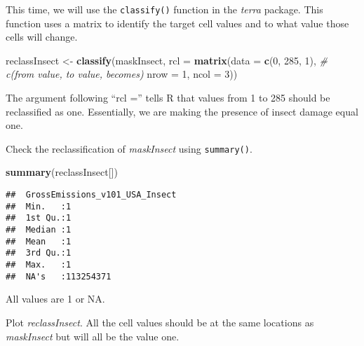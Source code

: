 \documentclass[
]{article}
\newenvironment{Shaded}{\begin{snugshade}}{\end{snugshade}}
\newcommand{\AttributeTok}[1]{\textcolor[rgb]{0.13,0.29,0.53}{#1}}
\newcommand{\CommentTok}[1]{\textcolor[rgb]{0.56,0.35,0.01}{\textit{#1}}}
\newcommand{\DecValTok}[1]{\textcolor[rgb]{0.00,0.00,0.81}{#1}}
\newcommand{\FunctionTok}[1]{\textcolor[rgb]{0.13,0.29,0.53}{\textbf{#1}}}
\newcommand{\NormalTok}[1]{#1}
\newcommand{\OtherTok}[1]{\textcolor[rgb]{0.56,0.35,0.01}{#1}}
\begin{document}
This time, we will use the \texttt{classify()} function in the
\emph{terra} package. This function uses a matrix to identify the target
cell values and to what value those cells will change.

\begin{Shaded}
\begin{Highlighting}[]
\NormalTok{reclassInsect }\OtherTok{\textless{}{-}} \FunctionTok{classify}\NormalTok{(maskInsect, }
                            \AttributeTok{rcl =} \FunctionTok{matrix}\NormalTok{(}\AttributeTok{data =} \FunctionTok{c}\NormalTok{(}\DecValTok{0}\NormalTok{, }\DecValTok{285}\NormalTok{, }\DecValTok{1}\NormalTok{),  }\CommentTok{\# c(from value, to value, becomes)}
                                         \AttributeTok{nrow =} \DecValTok{1}\NormalTok{, }\AttributeTok{ncol =} \DecValTok{3}\NormalTok{))}
\end{Highlighting}
\end{Shaded}

The argument following ``rcl ='' tells R that values from 1 to 285
should be reclassified as one. Essentially, we are making the presence
of insect damage equal one.

Check the reclassification of \emph{maskInsect} using
\texttt{summary()}.

\begin{Shaded}
\begin{Highlighting}[]
\FunctionTok{summary}\NormalTok{(reclassInsect[]) }
\end{Highlighting}
\end{Shaded}

\begin{verbatim}
##  GrossEmissions_v101_USA_Insect
##  Min.   :1                     
##  1st Qu.:1                     
##  Median :1                     
##  Mean   :1                     
##  3rd Qu.:1                     
##  Max.   :1                     
##  NA's   :113254371
\end{verbatim}

All values are 1 or NA.

Plot \emph{reclassInsect}. All the cell values should be at the same
locations as \emph{maskInsect} but will all be the value one.
\end{document}
